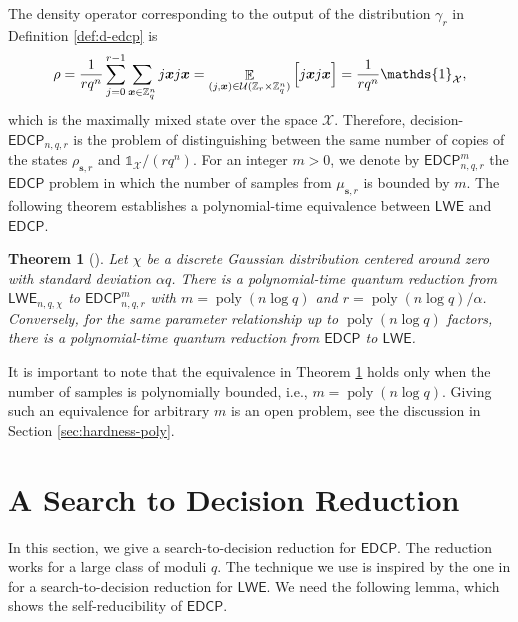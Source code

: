 \documentclass[11pt]{article}
\theoremstyle{plain}
\newtheorem{theorem}{Theorem}
\theoremstyle{definition}
\DeclareMathOperator{\poly}{poly}
\DeclareMathOperator{\E}{\mathbb{E}}
\let\ket\relax
\DeclarePairedDelimiter{\ket}{\lvert}{\rangle}
\let\bra\relax
\DeclarePairedDelimiter{\bra}{\langle}{\rvert}
\def\Z{\mathbb{Z}}
\def\lwe{\mathsf{LWE}}
\def\edcp{\mathsf{EDCP}}
\def\X{\mathcal{X}}
\def\U{\mathcal{U}}
\begin{document}
The density operator corresponding to the output of the distribution $\gamma_r$ in Definition \ref{def:d-edcp} is
\[ \rho = \frac{1}{rq^n} \sum_{j = 0}^{r - 1} \sum_{\bm{x} \in \Z_q^n}  \ket{j}\ket{\bm{x}} \bra{j}\bra{\bm{x}} = \E_{(j, \bm{x}) \in \U(\Z_r \times \Z_q^n)} \Big[ \ket{j}\ket{\bm{x}} \bra{j}\bra{\bm{x}} \Big] = \frac{1}{rq^n} \mathds{1}_{\X}, \]
which is the maximally mixed state over the space $\X$. Therefore, decision-$\edcp_{n, q, r}$ is the problem of distinguishing between the same number of copies of the states $\rho_{\bm{s}, r}$ and $\mathds{1}_{\X} / (rq^n)$. For an integer $m > 0$, we denote by $\edcp_{n, q, r}^m$ the $\edcp$ problem in which the number of samples from $\mu_{\bm{s}, r}$ is bounded by $m$. The following theorem establishes a polynomial-time equivalence between $\lwe$ and $\edcp$.

\begin{theorem}[\cite{brakerski2018learning}]
    \label{thm:lwe-edcp}
    Let $\chi$ be a discrete Gaussian distribution centered around zero with standard deviation $\alpha q$. There is a polynomial-time quantum reduction from $\lwe_{n, q, \chi}$ to $\edcp_{n, q, r}^m$ with $m = \poly(n\log q)$ and $r = \poly(n\log q) / \alpha$. Conversely, for the same parameter relationship up to $\poly(n\log q)$ factors, there is a polynomial-time quantum reduction from $\edcp$ to $\lwe$. 
\end{theorem}

It is important to note that the equivalence in Theorem \ref{thm:lwe-edcp} holds only when the number of samples is polynomially bounded, i.e., $m = \poly(n\log q)$. Giving such an equivalence for arbitrary $m$ is an open problem, see the discussion in Section \ref{sec:hardness-poly}.





\section{A Search to Decision Reduction}

In this section, we give a search-to-decision reduction for $\edcp$. The reduction works for a large class of moduli $q$. The technique we use is inspired by the one in \cite{micciancio2012trapdoors} for a search-to-decision reduction for $\lwe$. We need the following lemma, which shows the self-reducibility of $\edcp$.
\end{document}
